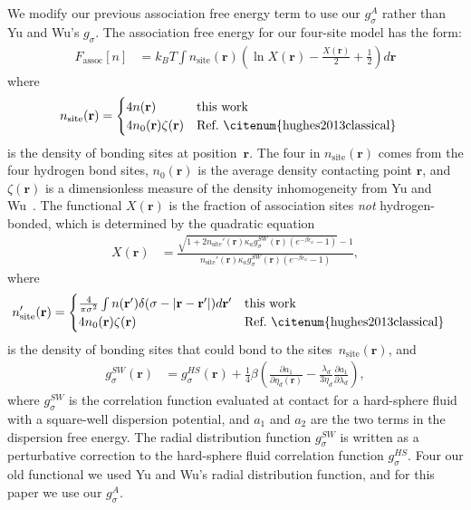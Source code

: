 \documentclass[twocolumn,amsmath,amssymb,prl]{revtex4-1}
\newcommand{\rr}{\textbf{r}}
\newcommand{\xx}{\textbf{r}}
\newcommand\etadisp{\ensuremath{\eta_\textit{d}}}
\newcommand\epsilonassoc{\ensuremath{\epsilon_\textit{a}}}
\newcommand\kappaassoc{\ensuremath{\kappa_\textit{a}}}
\newcommand\lambdadisp{\ensuremath{\lambda_\textit{d}}}
\begin{document}
We modify our previous association free energy term to use our
$g_{\sigma}^\textit{A}$ rather than Yu and Wu's $g_\sigma$.  The
association free energy for our four-site model has the form:
\begin{align}
  F_\text{assoc}[n] &= k_BT \int n_\text{site}(\xx)
  \left(\ln X(\xx) - \frac{X(\xx)}{2} + \frac12\right) d\xx
\end{align}
where
\begin{align}
  n_\text{site}(\rr) &=
  \begin{cases}
    4 n(\rr) & \text{this work}\\
    4 n_0(\rr) \zeta(\rr) & \text{Ref.~\citenum{hughes2013classical}}
  \end{cases} 
\end{align}
is the density of bonding sites at position~$\rr$.  The four in
$n_\text{site}(\rr)$ comes from the four hydrogen bond sites,
$n_0(\rr)$ is the average density contacting point $\rr$, and
$\zeta(\xx)$ is a dimensionless measure of the density inhomogeneity
from Yu and Wu~\cite{yu2002fmt-dft-inhomogeneous-associating}.  The
functional $X(\rr)$ is the fraction of association sites \emph{not}
hydrogen-bonded, which is determined by the quadratic equation
\begin{align}
  X(\xx) &= \frac{\sqrt{1 + 2n_\text{site}'(\rr)
      \kappaassoc g^\textit{SW}_\sigma(\xx)
  \left(e^{-\beta\epsilonassoc} - 1\right)} - 1}
  {n_\text{site}'(\rr)
    \kappaassoc g^\textit{SW}_\sigma(\xx)
  \left(e^{-\beta\epsilonassoc} - 1\right)}, \label{eq:X}
\end{align}
where
\begin{align}
  n_\text{site}'(\rr) &=
  \begin{cases}
    \frac{4}{\pi\sigma^2} \int n(\rr')\delta(\sigma - |\rr-\rr'|) d\rr' & \text{this work}\\
    4 n_0(\rr) \zeta(\rr) & \text{Ref.~\citenum{hughes2013classical}}
  \end{cases} 
\end{align}
is the density of bonding sites that could bond to the sites~$n_\text{site}(\rr)$, and
\begin{align}
  g^\textit{SW}_\sigma(\xx) &= g^\textit{HS}_\sigma(\xx) +
  \frac{1}{4}\beta\left(\frac{\partial a_1}{\partial \etadisp(\xx)} -
  \frac{\lambdadisp}{3 \etadisp}\frac{\partial a_1}{\partial \lambdadisp}\right)\label{eq:gSW},
\end{align}
where $g^\textit{SW}_\sigma$ is the correlation function evaluated at
contact for a hard-sphere fluid with a square-well dispersion
potential, and $a_1$ and $a_2$ are the two terms in the dispersion
free energy.  The radial distribution function $g^\textit{SW}_\sigma$ is
written as a perturbative correction to the hard-sphere fluid
correlation function $g^\textit{HS}_\sigma$. Four our old functional
we used Yu and Wu's radial distribution function, and for this paper we
use our $g^\textit{A}_\sigma$.
\end{document}
